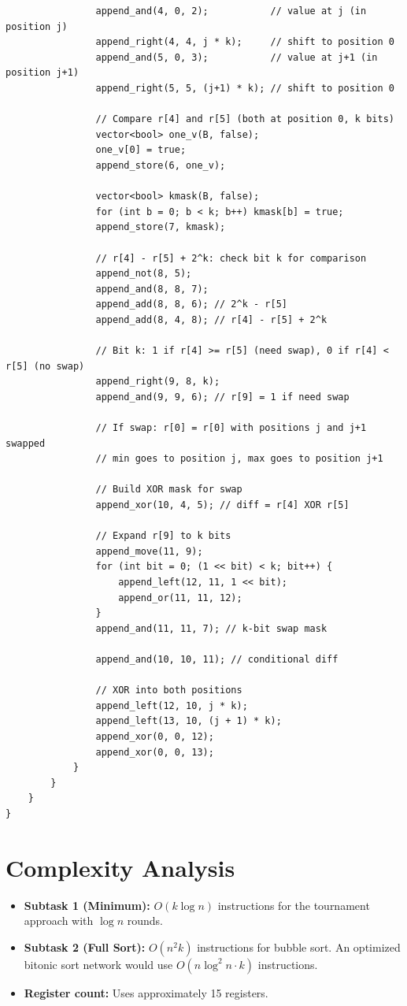 \documentclass[11pt,a4paper]{article}
\begin{document}
\begin{lstlisting}
                append_and(4, 0, 2);           // value at j (in position j)
                append_right(4, 4, j * k);     // shift to position 0
                append_and(5, 0, 3);           // value at j+1 (in position j+1)
                append_right(5, 5, (j+1) * k); // shift to position 0

                // Compare r[4] and r[5] (both at position 0, k bits)
                vector<bool> one_v(B, false);
                one_v[0] = true;
                append_store(6, one_v);

                vector<bool> kmask(B, false);
                for (int b = 0; b < k; b++) kmask[b] = true;
                append_store(7, kmask);

                // r[4] - r[5] + 2^k: check bit k for comparison
                append_not(8, 5);
                append_and(8, 8, 7);
                append_add(8, 8, 6); // 2^k - r[5]
                append_add(8, 4, 8); // r[4] - r[5] + 2^k

                // Bit k: 1 if r[4] >= r[5] (need swap), 0 if r[4] < r[5] (no swap)
                append_right(9, 8, k);
                append_and(9, 9, 6); // r[9] = 1 if need swap

                // If swap: r[0] = r[0] with positions j and j+1 swapped
                // min goes to position j, max goes to position j+1

                // Build XOR mask for swap
                append_xor(10, 4, 5); // diff = r[4] XOR r[5]

                // Expand r[9] to k bits
                append_move(11, 9);
                for (int bit = 0; (1 << bit) < k; bit++) {
                    append_left(12, 11, 1 << bit);
                    append_or(11, 11, 12);
                }
                append_and(11, 11, 7); // k-bit swap mask

                append_and(10, 10, 11); // conditional diff

                // XOR into both positions
                append_left(12, 10, j * k);
                append_left(13, 10, (j + 1) * k);
                append_xor(0, 0, 12);
                append_xor(0, 0, 13);
            }
        }
    }
}
\end{lstlisting}

\section{Complexity Analysis}
\begin{itemize}
  \item \textbf{Subtask 1 (Minimum):} $O(k \log n)$ instructions for the tournament approach with $\log n$ rounds.
  \item \textbf{Subtask 2 (Full Sort):} $O(n^2 k)$ instructions for bubble sort. An optimized bitonic sort network would use $O(n \log^2 n \cdot k)$ instructions.
  \item \textbf{Register count:} Uses approximately 15 registers.
\end{itemize}
\end{document}
